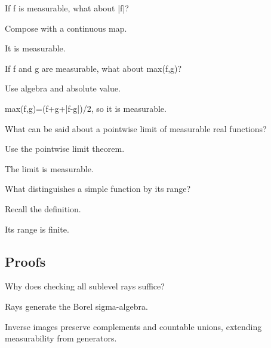 \begin{exercise}\label{exr:iii02-expand-02}
If f is measurable, what about |f|?
\end{exercise}
\begin{hint}
Compose with a continuous map.
\end{hint}
\begin{solution}
It is measurable.
\end{solution}

\begin{exercise}[Maximum]\label{exr:iii02-expand-03}
If f and g are measurable, what about max(f,g)?
\end{exercise}
\begin{hint}
Use algebra and absolute value.
\end{hint}
\begin{solution}
max(f,g)=(f+g+|f-g|)/2, so it is measurable.
\end{solution}

\begin{exercise}\label{exr:iii02-expand-04}
What can be said about a pointwise limit of measurable real functions?
\end{exercise}
\begin{hint}
Use the pointwise limit theorem.
\end{hint}
\begin{solution}
The limit is measurable.
\end{solution}

\begin{exercise}\label{exr:iii02-expand-05}
What distinguishes a simple function by its range?
\end{exercise}
\begin{hint}
Recall the definition.
\end{hint}
\begin{solution}
Its range is finite.
\end{solution}

\subsection*{Proofs}

\begin{exercise}\label{exr:iii02-expand-06}
Why does checking all sublevel rays suffice?
\end{exercise}
\begin{hint}
Rays generate the Borel sigma-algebra.
\end{hint}
\begin{solution}
Inverse images preserve complements and countable unions, extending measurability from generators.
\end{solution}

